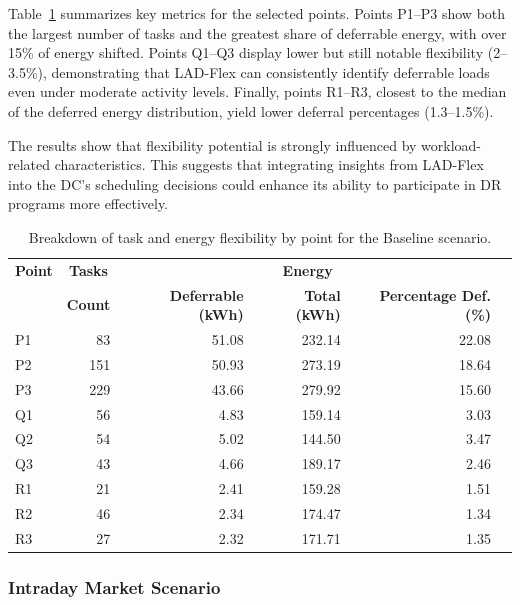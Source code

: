 \documentclass[preprint,12pt]{elsarticle}
\begin{document}
Table~\ref{tab:energy_flexibility_baseline} summarizes key metrics for the selected points. Points P1–P3 show both the largest number of tasks and the greatest share of deferrable energy, with over 15\% of energy shifted. Points Q1–Q3 display lower but still notable flexibility (2–3.5\%), demonstrating that LAD-Flex can consistently identify deferrable loads even under moderate activity levels. Finally, points R1–R3, closest to the median of the deferred energy distribution, yield lower deferral percentages (1.3–1.5\%).

The results show that flexibility potential is strongly influenced by workload-related characteristics. This suggests that integrating insights from LAD-Flex into the DC's scheduling decisions could enhance its ability to participate in DR programs more effectively.

\begin{table}[h!]
\centering
\renewcommand{\arraystretch}{1.2}
\begin{tabular}{@{}lrr rrr@{}}
\toprule
\textbf{Point} & \multicolumn{1}{c}{\textbf{Tasks}} & \multicolumn{3}{c}{\textbf{Energy}} \\
              & \textbf{Count} & \textbf{Deferrable (kWh)} & \textbf{Total (kWh)} & \textbf{Percentage Def. (\%)} \\
\midrule
P1 & 83  & 51.08 & 232.14 & 22.08 \\
P2 & 151 & 50.93 & 273.19 & 18.64 \\
P3 & 229 & 43.66 & 279.92 & 15.60 \\
Q1 & 56  & 4.83  & 159.14 & 3.03  \\
Q2 & 54  & 5.02  & 144.50 & 3.47  \\
Q3 & 43  & 4.66  & 189.17 & 2.46  \\
R1 & 21  & 2.41  & 159.28 & 1.51  \\
R2 & 46  & 2.34  & 174.47 & 1.34  \\
R3 & 27  & 2.32  & 171.71 & 1.35  \\
\bottomrule
\end{tabular}
\caption{Breakdown of task and energy flexibility by point for the Baseline scenario.}
\label{tab:energy_flexibility_baseline}
\end{table}


\subsubsection{Intraday Market Scenario} \label{intraday_scenario}
\end{document}
